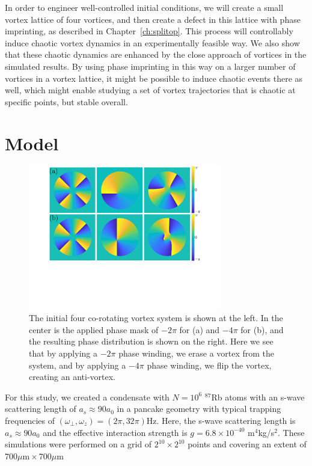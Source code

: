In order to engineer well-controlled initial conditions, we will create a small vortex lattice of four vortices, and then create a defect in this lattice with phase imprinting, as described in Chapter~\ref{ch:splitop}.
This process will controllably induce chaotic vortex dynamics in an experimentally feasible way.
We also show that these chaotic dynamics are enhanced by the close approach of vortices in the simulated results.
By using phase imprinting in this way on a larger number of vortices in a vortex lattice, it might be possible to induce chaotic events there as well, which might enable studying a set of vortex trajectories that is chaotic at specific points, but stable overall.

\section{Model}

\begin{figure}
\center \includegraphics[width=0.75\textwidth]{data/2d/phase/phase}

\caption{
The initial four co-rotating vortex system is shown at the left.
In the center is the applied phase mask of $-2\pi$ for (a) and $-4\pi$ for (b), and the resulting phase distribution is shown on the right.
Here we see that by applying a $-2\pi$ phase winding, we erase a vortex from the system, and by applying a $-4\pi$ phase winding, we flip the vortex, creating an anti-vortex.
}
\label{fig:phase}
\end{figure}


For this study, we created a condensate with $N = 10^6$ $^{87}$Rb atoms with an s-wave scattering length of $a_s \approx 90a_0$ in a pancake geometry with typical trapping frequencies of $(\omega_\perp, \omega_z) = (2\pi, 32\pi)$Hz.
Here, the s-wave scattering length is $a_s \approx 90a_0$ and the effective interaction strength is $g = 6.8\times 10^{-40}$ m$^4$kg/s$^2$.
These simulations were performed on a grid of $2^{10} \times 2^{10}$ points and covering an extent of $700\mu \text{m} \times 700 \mu \text{m}$

